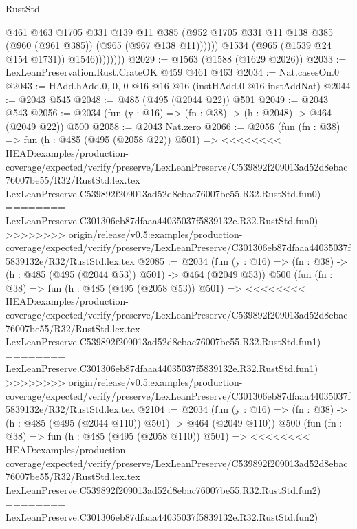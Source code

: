 \begin{lexlean}{RustStd}
\begin{coremodule}
{\begin{coremodule}
{{{{{{{                          @461
                          @463
                          @1705
                          @331
                          @139
                          @11
                          @385
                          (@952
                            @1705
                            @331
                            @11
                            @138
                            @385
                            (@960 (@961 @385))
                            (@965 (@967 @138 @11))))))
                    @1534
                    (@965 (@1539 @24 @154 @1731))
                    @1546))))))))
@2029 := @1563 (@1588 (@1629 @2026))
@2033 := LexLeanPreservation.Rust.CrateOK @459 @461 @463
@2034 := Nat.casesOn.{0}
@2043 := HAdd.hAdd.{0, 0, 0} @16 @16 @16 (instHAdd.{0} @16 instAddNat)
@2044 := @2043 @545
@2048 := @485 (@495 (@2044 @22)) @501
@2049 := @2043 @543
@2056 := @2034 (fun (y : @16) => (fn : @38) -> (h : @2048) -> @464 (@2049 @22)) @500
@2058 := @2043 Nat.zero
@2066 := @2056
    (fun (fn : @38) =>
    fun (h : @485 (@495 (@2058 @22)) @501) =>
<<<<<<<< HEAD:examples/production-coverage/expected/verify/preserve/LexLeanPreserve/C539892f209013ad52d8ebac76007be55/R32/RustStd.lex.tex
    LexLeanPreserve.C539892f209013ad52d8ebac76007be55.R32.RustStd.fun0)
========
    LexLeanPreserve.C301306eb87dfaaa44035037f5839132e.R32.RustStd.fun0)
>>>>>>>> origin/release/v0.5:examples/production-coverage/expected/verify/preserve/LexLeanPreserve/C301306eb87dfaaa44035037f5839132e/R32/RustStd.lex.tex
@2085 := @2034
    (fun (y : @16) => (fn : @38) -> (h : @485 (@495 (@2044 @53)) @501) -> @464 (@2049 @53))
    @500
    (fun (fn : @38) =>
    fun (h : @485 (@495 (@2058 @53)) @501) =>
<<<<<<<< HEAD:examples/production-coverage/expected/verify/preserve/LexLeanPreserve/C539892f209013ad52d8ebac76007be55/R32/RustStd.lex.tex
    LexLeanPreserve.C539892f209013ad52d8ebac76007be55.R32.RustStd.fun1)
========
    LexLeanPreserve.C301306eb87dfaaa44035037f5839132e.R32.RustStd.fun1)
>>>>>>>> origin/release/v0.5:examples/production-coverage/expected/verify/preserve/LexLeanPreserve/C301306eb87dfaaa44035037f5839132e/R32/RustStd.lex.tex
@2104 := @2034
    (fun (y : @16) => (fn : @38) -> (h : @485 (@495 (@2044 @110)) @501) -> @464 (@2049 @110))
    @500
    (fun (fn : @38) =>
    fun (h : @485 (@495 (@2058 @110)) @501) =>
<<<<<<<< HEAD:examples/production-coverage/expected/verify/preserve/LexLeanPreserve/C539892f209013ad52d8ebac76007be55/R32/RustStd.lex.tex
    LexLeanPreserve.C539892f209013ad52d8ebac76007be55.R32.RustStd.fun2)
========
    LexLeanPreserve.C301306eb87dfaaa44035037f5839132e.R32.RustStd.fun2)
}}}}}}}
\end{coremodule}}
\end{coremodule}
\end{lexlean}
